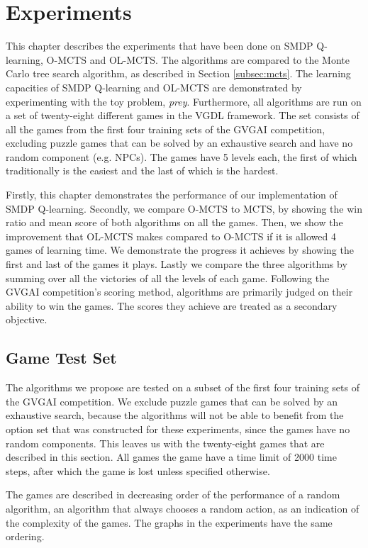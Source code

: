 \chapter{Experiments}
\label{sec:experiments}
This chapter describes the experiments that have been done on SMDP Q-learning,
O-MCTS and OL-MCTS. The algorithms are compared to the Monte Carlo tree search
algorithm, as described in Section \ref{subsec:mcts}. The learning capacities of
SMDP Q-learning and OL-MCTS are demonstrated by experimenting with the toy
problem, \textit{prey}. Furthermore, all algorithms are run on a set of
twenty-eight different games in the VGDL framework. The set consists of all the
games from the first four training sets of the GVGAI competition, excluding
puzzle games that can be solved by an exhaustive search and have no random
component (e.g. NPCs). The games have 5 levels each, the first of which
traditionally is the easiest and the last of which is the hardest.

Firstly, this chapter demonstrates the performance of our implementation of SMDP
Q-learning. Secondly, we compare O-MCTS to MCTS, by showing the win ratio and
mean score of both algorithms on all the games. Then, we show the improvement
that OL-MCTS makes compared to O-MCTS if it is allowed 4 games of learning time.
We demonstrate the progress it achieves by showing the first and last of the
games it plays.  Lastly we compare the three algorithms by summing over all the
victories of all the levels of each game.  Following the GVGAI competition's
scoring method, algorithms are primarily judged on their ability to win the
games. The scores they achieve are treated as a secondary objective.

\section{Game Test Set}
\label{subsec:games}
The algorithms we propose are tested on a subset of the first four training sets
of the GVGAI competition. We exclude puzzle games that can be solved by an
exhaustive search, because the algorithms will not be able to benefit from the
option set that was constructed for these experiments, since the games have no
random components. This leaves us with the twenty-eight games that are described
in this section. All games the game have a time limit of 2000 time steps, after
which the game is lost unless specified otherwise.

The games are described in decreasing order of the performance of a random
algorithm, an algorithm that always chooses a random action, as an indication of
the complexity of the games. The graphs in the experiments have the same
ordering.

